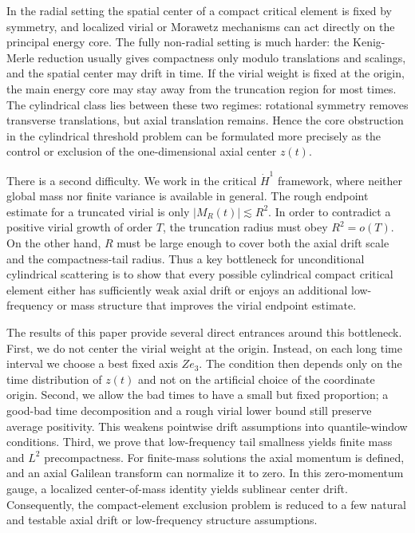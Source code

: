 \documentclass[preprint,12pt]{elsarticle}
\numberwithin{equation}{section}
\newcommand{\ez}{e_3}
\theoremstyle{remark}
\begin{document}
In the radial setting the spatial center of a compact critical element is fixed by symmetry, and localized virial or Morawetz mechanisms can act directly on the principal energy core.  The fully non-radial setting is much harder: the Kenig-Merle reduction usually gives compactness only modulo translations and scalings, and the spatial center may drift in time.  If the virial weight is fixed at the origin, the main energy core may stay away from the truncation region for most times.  The cylindrical class lies between these two regimes: rotational symmetry removes transverse translations, but axial translation remains.  Hence the core obstruction in the cylindrical threshold problem can be formulated more precisely as the control or exclusion of the one-dimensional axial center $z(t)$.

There is a second difficulty.  We work in the critical $\dot H^1$ framework, where neither global mass nor finite variance is available in general.  The rough endpoint estimate for a truncated virial is only $|M_R(t)|\lesssim R^2$.  In order to contradict a positive virial growth of order $T$, the truncation radius must obey $R^2=o(T)$.  On the other hand, $R$ must be large enough to cover both the axial drift scale and the compactness-tail radius.  Thus a key bottleneck for unconditional cylindrical scattering is to show that every possible cylindrical compact critical element either has sufficiently weak axial drift or enjoys an additional low-frequency or mass structure that improves the virial endpoint estimate.

The results of this paper provide several direct entrances around this bottleneck.  First, we do not center the virial weight at the origin.  Instead, on each long time interval we choose a best fixed axis $Z\ez$.  The condition then depends only on the time distribution of $z(t)$ and not on the artificial choice of the coordinate origin.  Second, we allow the bad times to have a small but fixed proportion; a good-bad time decomposition and a rough virial lower bound still preserve average positivity.  This weakens pointwise drift assumptions into quantile-window conditions.  Third, we prove that low-frequency tail smallness yields finite mass and $L^2$ precompactness.  For finite-mass solutions the axial momentum is defined, and an axial Galilean transform can normalize it to zero.  In this zero-momentum gauge, a localized center-of-mass identity yields sublinear center drift.  Consequently, the compact-element exclusion problem is reduced to a few natural and testable axial drift or low-frequency structure assumptions.
\end{document}
